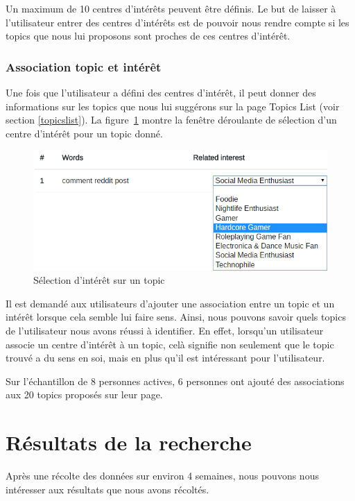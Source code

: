 			Un maximum de 10 centres d'intérêts peuvent être définis. Le but de laisser à l'utilisateur entrer des centres d'intérêts est de pouvoir nous rendre compte si les topics que nous lui proposons sont proches de ces centres d'intérêt.

		\subsubsection{Association topic et intérêt}

			Une fois que l'utilisateur a défini des centres d'intérêt, il peut donner des informations sur les topics que nous lui suggérons sur la page Topics List (voir section \ref{topicslist}). La figure~\ref{choice} montre la fenêtre déroulante de sélection d'un centre d'intérêt pour un topic donné.

			\begin{figure}[!h]
				\centering
				\includegraphics[height=0.32\textwidth]{images/results/choice}
				\caption{Sélection d'intérêt sur un topic}
				\label{choice}
			\end{figure}

			Il est demandé aux utilisateurs d'ajouter une association entre un topic et un intérêt lorsque cela semble lui faire sens. Ainsi, nous pouvons savoir quels topics de l'utilisateur nous avons réussi à identifier. En effet, lorsqu'un utilisateur associe un centre d'intérêt à un topic, celà signifie non seulement que le topic trouvé a du sens en soi, mais en plus qu'il est intéressant pour l'utilisateur.

			Sur l'échantillon de 8 personnes actives, 6 personnes ont ajouté des associations aux 20 topics proposés sur leur page. 

\section{Résultats de la recherche}

	Après une récolte des données sur environ 4 semaines, nous pouvons nous intéresser aux résultats que nous avons récoltés.

